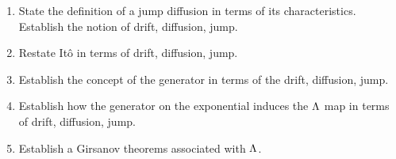 \begin{enumerate}
  \item
    State the definition of a jump diffusion in terms of its characteristics.
    Establish the notion of drift, diffusion, jump.
  \item
    Restate It\^o in terms of drift, diffusion, jump.
  \item
    Establish the concept of the generator in terms of the drift, diffusion, jump.
  \item
    Establish how the generator on the exponential induces the $\Lambda$ map in terms of drift, diffusion, jump.
  \item
    Establish a Girsanov theorems associated with $\Lambda$.
\end{enumerate}
